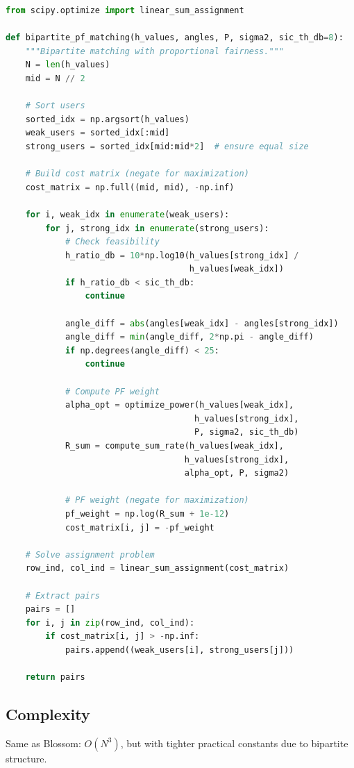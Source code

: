 \begin{lstlisting}[language=Python, caption={Bipartite PF Matching}]
from scipy.optimize import linear_sum_assignment

def bipartite_pf_matching(h_values, angles, P, sigma2, sic_th_db=8):
    """Bipartite matching with proportional fairness."""
    N = len(h_values)
    mid = N // 2
    
    # Sort users
    sorted_idx = np.argsort(h_values)
    weak_users = sorted_idx[:mid]
    strong_users = sorted_idx[mid:mid*2]  # ensure equal size
    
    # Build cost matrix (negate for maximization)
    cost_matrix = np.full((mid, mid), -np.inf)
    
    for i, weak_idx in enumerate(weak_users):
        for j, strong_idx in enumerate(strong_users):
            # Check feasibility
            h_ratio_db = 10*np.log10(h_values[strong_idx] / 
                                     h_values[weak_idx])
            if h_ratio_db < sic_th_db:
                continue
            
            angle_diff = abs(angles[weak_idx] - angles[strong_idx])
            angle_diff = min(angle_diff, 2*np.pi - angle_diff)
            if np.degrees(angle_diff) < 25:
                continue
            
            # Compute PF weight
            alpha_opt = optimize_power(h_values[weak_idx],
                                      h_values[strong_idx],
                                      P, sigma2, sic_th_db)
            R_sum = compute_sum_rate(h_values[weak_idx],
                                    h_values[strong_idx],
                                    alpha_opt, P, sigma2)
            
            # PF weight (negate for maximization)
            pf_weight = np.log(R_sum + 1e-12)
            cost_matrix[i, j] = -pf_weight
    
    # Solve assignment problem
    row_ind, col_ind = linear_sum_assignment(cost_matrix)
    
    # Extract pairs
    pairs = []
    for i, j in zip(row_ind, col_ind):
        if cost_matrix[i, j] > -np.inf:
            pairs.append((weak_users[i], strong_users[j]))
    
    return pairs
\end{lstlisting}

\subsection{Complexity}
Same as Blossom: $O(N^3)$, but with tighter practical constants due to bipartite structure.

